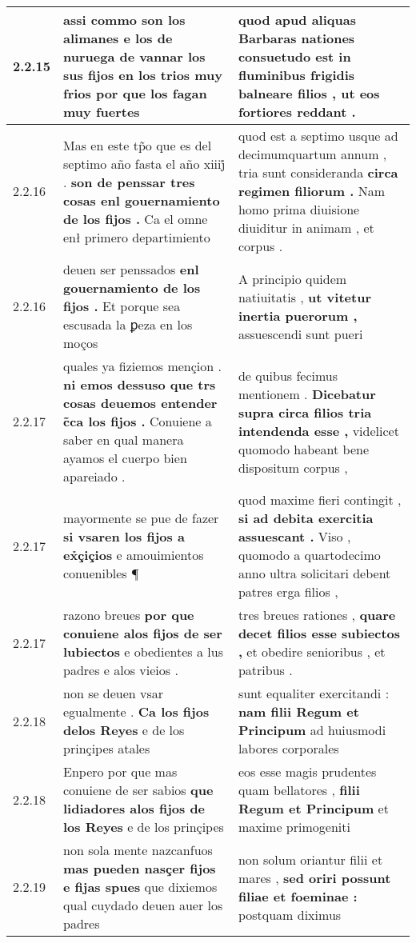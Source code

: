 \begin{tabular}{|p{1cm}|p{6.5cm}|p{6.5cm}|}
2.2.15 & assi commo son los alimanes \textbf{ e los de nuruega de vannar los sus fijos en los trios muy frios } por que los fagan muy fuertes & quod apud aliquas Barbaras nationes consuetudo est \textbf{ in fluminibus frigidis balneare filios , } ut eos fortiores reddant . \\\hline
2.2.16 & Mas en este tp̃o que es del septimo año fasta el año xiiij̊ . \textbf{ son de penssar tres cosas enl gouernamiento de los fijos . } Ca el omne enł primero departimiento & quod est a septimo usque ad decimumquartum annum , tria sunt consideranda \textbf{ circa regimen filiorum . } Nam homo prima diuisione diuiditur in animam , et corpus . \\\hline
2.2.16 & deuen ser penssados \textbf{ enl gouernamiento de los fijos . } Et porque sea escusada la ꝑeza en los moços & A principio quidem natiuitatis , \textbf{ ut vitetur inertia puerorum , } assuescendi sunt pueri \\\hline
2.2.17 & quales ya fiziemos mençion . \textbf{ ni emos dessuso que trs cosas deuemos entender c̃ca los fijos . } Conuiene a saber en qual manera ayamos el cuerpo bien apareiado . & de quibus fecimus mentionem . \textbf{ Dicebatur supra circa filios tria intendenda esse , } videlicet quomodo habeant bene dispositum corpus , \\\hline
2.2.17 & mayormente se pue de fazer \textbf{ si vsaren los fijos a ex̉çiçios } e amouimientos conuenibles ¶ & quod maxime fieri contingit , \textbf{ si ad debita exercitia assuescant . } Viso , quomodo a quartodecimo anno ultra solicitari debent patres erga filios , \\\hline
2.2.17 & razono breues \textbf{ por que conuiene alos fijos de ser lubiectos } e obedientes a lus padres e alos vieios . & tres breues rationes , \textbf{ quare decet filios esse subiectos , } et obedire senioribus , et patribus . \\\hline
2.2.18 & non se deuen vsar egualmente . \textbf{ Ca los fijos delos Reyes } e de los prinçipes atales & sunt equaliter exercitandi : \textbf{ nam filii Regum et Principum } ad huiusmodi labores corporales \\\hline
2.2.18 & Enpero por que mas conuiene de ser sabios \textbf{ que lidiadores alos fijos de los Reyes } e de los prinçipes & eos esse magis prudentes quam bellatores , \textbf{ filii Regum et Principum } et maxime primogeniti \\\hline
2.2.19 & non sola mente nazcanfuos \textbf{ mas pueden nasçer fijos e fijas spues } que dixiemos qual cuydado deuen auer los padres & non solum oriantur filii et mares , \textbf{ sed oriri possunt filiae et foeminae : } postquam diximus \\\hline

\end{tabular}
